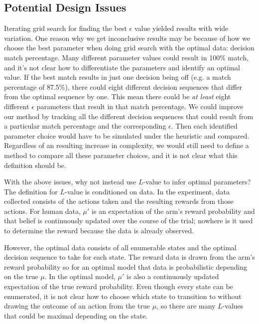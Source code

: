 \subsection{Potential Design Issues}
Iterating grid search for finding the best $\epsilon$ value yielded results with wide variation. One reason why we get inconclusive results may be because of how we choose the best parameter when doing grid search with the optimal data: decision match percentage. Many different parameter values could result in 100\% match, and it's not clear how to differentiate the parameters and identify an optimal value. If the best match results in just one decision being off (e.g. a match percentage of 87.5\%), there could eight different decision sequences that differ from the optimal sequence by one. This mean there could be \textit{at least} eight different $\epsilon$ parameters that result in that match percentage. We could improve our method by tracking all the different decision sequences that could result from a particular match percentage and the corresponding $\epsilon$. Then each identified parameter choice would have to be simulated under the heuristic and compared. Regardless of an resulting increase in complexity, we would still need to define a method to compare all these parameter choices, and it is not clear what this definition should be.

With the above issues, why not instead use $L$-value to infer optimal parameters? The definition for $L$-value is conditioned on data. In the experiment, data collected consists of the actions taken and the resulting rewards from those actions. For human data, $\mu'$ is an expectation of the arm's reward probability and that belief is continuously updated over the course of the trial; nowhere is it used to determine the reward because the data is already observed. 

However, the optimal data consists of all enumerable states and the optimal decision sequence to take for each state. The reward data is drawn from the arm's reward probability so for an optimal model that data is probabilistic depending on the true $\mu$. In the optimal model, $\mu'$ is also a continuously updated expectation of the true reward probability. Even though every state can be enumerated, it is not clear how to choose which state to transition to without drawing the outcome of an action from the true $\mu$, so there are many $L$-values that could be maximal depending on the state.